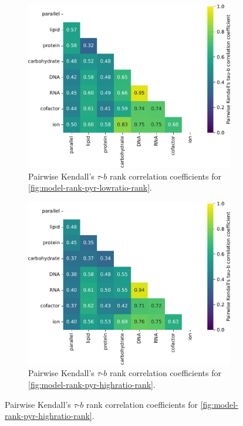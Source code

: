 \begin{figure}
  \begin{subfigure}[t]{0.45\textwidth}
  \centering
    \includegraphics[width=\linewidth]{CompareEnzUse_glc00p00_pyr08p89_ammUnres_2.pdf}
    \caption{
      Pairwise Kendall's $\tau$-$b$ rank correlation coefficients for \ref{fig:model-rank-pyr-lowratio-rank}.
    }
    \label{fig:model-rank-pyr-lowratio-kendall}
  \end{subfigure}%
  \begin{subfigure}[t]{0.45\textwidth}
  \centering
    \includegraphics[width=\linewidth]{CompareEnzUse_glc00p00_pyr03p73_amm00p90_2.pdf}
    \caption{
      Pairwise Kendall's $\tau$-$b$ rank correlation coefficients for \ref{fig:model-rank-pyr-highratio-rank}.
    }
    \label{fig:model-rank-pyr-highratio-kendall}
  \end{subfigure}


\end{figure}
